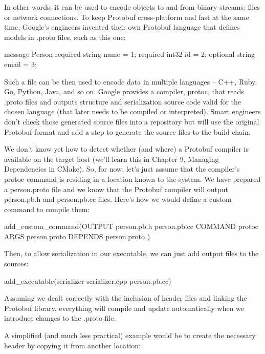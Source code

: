 In other words: it can be used to encode objects to and from binary streams: files or network connections. To keep Protobuf cross-platform and fast at the same time, Google’s engineers invented their own Protobuf language that defines models in .proto files, such as this one:

\begin{shell}
message Person {
    required string name = 1;
    required int32 id = 2;
    optional string email = 3;
}
\end{shell}

Such a file can be then used to encode data in multiple languages – C++, Ruby, Go, Python, Java, and so on. Google provides a compiler, protoc, that reads .proto files and outputs structure and serialization source code valid for the chosen language (that later needs to be compiled or interpreted). Smart engineers don’t check those generated source files into a repository but will use the original Protobuf format and add a step to generate the source files to the build chain.

We don’t know yet how to detect whether (and where) a Protobuf compiler is available on the target host (we’ll learn this in Chapter 9, Managing Dependencies in CMake). So, for now, let’s just assume that the compiler’s protoc command is residing in a location known to the system. We have prepared a person.proto file and we know that the Protobuf compiler will output person.pb.h and person.pb.cc files. Here’s how we would define a custom command to compile them:

\begin{cmake}
add_custom_command(OUTPUT person.pb.h person.pb.cc
        COMMAND protoc ARGS person.proto
        DEPENDS person.proto
)
\end{cmake}

Then, to allow serialization in our executable, we can just add output files to the sources:

\begin{cmake}
add_executable(serializer serializer.cpp person.pb.cc)
\end{cmake}

Assuming we dealt correctly with the inclusion of header files and linking the Protobuf library, everything will compile and update automatically when we introduce changes to the .proto file.

A simplified (and much less practical) example would be to create the necessary header by copying it from another location:

